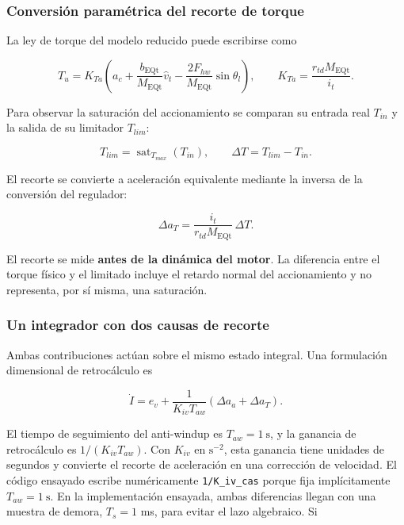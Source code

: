 \documentclass[a4paper,10pt,onecolumn,journal]{ieeeconf}
\numberwithin{equation}{section}
\begin{document}

\subsubsection{Conversión paramétrica del recorte de torque}

La ley de torque del modelo reducido puede escribirse como

\begin{equation}
T_u=K_{Ta}\left(a_c+\frac{b_{\mathrm{EQt}}}{M_{\mathrm{EQt}}}\hat v_t
-\frac{2F_{hw}}{M_{\mathrm{EQt}}}\sin\theta_l\right),
\qquad K_{Ta}=\frac{r_{td}M_{\mathrm{EQt}}}{i_t}.
\end{equation}

Para observar la saturación del accionamiento se comparan su entrada real $T_{in}$ y la salida de su limitador $T_{lim}$:

\begin{equation}
T_{lim}=\operatorname{sat}_{T_{max}}(T_{in}),\qquad
\Delta T=T_{lim}-T_{in}.
\end{equation}

El recorte se convierte a aceleración equivalente mediante la inversa de la conversión del regulador:

\begin{equation}
\boxed{\Delta a_T=\frac{i_t}{r_{td}M_{\mathrm{EQt}}}\,\Delta T.}
\end{equation}

El recorte se mide \textbf{antes de la dinámica del motor}. La diferencia entre el torque físico y el limitado incluye el retardo normal del accionamiento y no representa, por sí misma, una saturación.


\subsubsection{Un integrador con dos causas de recorte}

Ambas contribuciones actúan sobre el mismo estado integral. Una formulación dimensional de retrocálculo es

\begin{equation}
\dot I=e_v+\frac{1}{K_{iv}T_{aw}}\left(\Delta a_a+\Delta a_T\right).
\end{equation}

El tiempo de seguimiento del anti-windup es $T_{aw}=1~\mathrm{s}$, y la ganancia de retrocálculo es $1/(K_{iv}T_{aw})$. Con $K_{iv}$ en $\mathrm{s^{-2}}$, esta ganancia tiene unidades de segundos y convierte el recorte de aceleración en una corrección de velocidad. El código ensayado escribe numéricamente \texttt{1/K\_iv\_cas} porque fija implícitamente $T_{aw}=1~\mathrm{s}$. En la implementación ensayada, ambas diferencias llegan con una muestra de demora, $T_s=1$ ms, para evitar el lazo algebraico. Si
\end{document}
